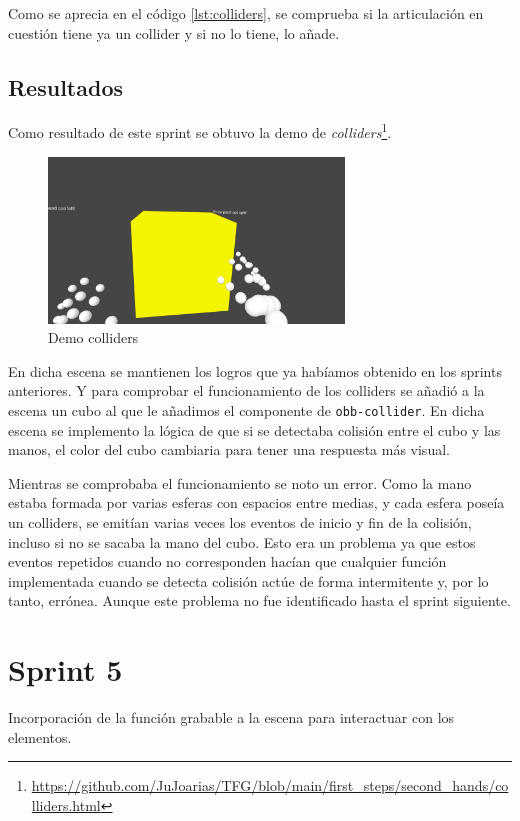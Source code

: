 \documentclass[a4paper, 12pt]{book}
\begin{document}
Como se aprecia en el código \ref{lst:colliders}, se comprueba si la articulación en cuestión tiene ya un collider y si no lo tiene, lo añade.

\subsection{Resultados}
\label{subsec:resultados4}
Como resultado de este sprint se obtuvo la demo de \textit{colliders}\footnote{\url{https://github.com/JuJoarias/TFG/blob/main/first_steps/second_hands/colliders.html}}. 

\begin{figure}[H] 
  \centering
  \includegraphics[width=0.7\textwidth]{img/collider.jpg} 
  \caption{Demo colliders}
  \label{fig:sprint4}
\end{figure}

En dicha escena se mantienen los logros que ya habíamos obtenido en los sprints anteriores. Y para comprobar el funcionamiento de los colliders se añadió a la escena un cubo
al que le añadimos el componente de \texttt{obb-collider}. En dicha escena se implemento la lógica de que si se detectaba colisión entre el cubo y las manos, el color del cubo cambiaria para tener una respuesta más visual. 

Mientras se comprobaba el funcionamiento se noto un error. Como la mano estaba formada por varias esferas con espacios entre medias, y cada esfera poseía un colliders, se emitían varias veces los eventos de inicio y fin de la colisión, incluso si no se sacaba la mano del cubo. 
Esto era un problema ya que estos eventos repetidos cuando no corresponden hacían que cualquier función implementada cuando se detecta colisión actúe de forma intermitente y, por lo tanto, errónea. Aunque este problema no fue identificado hasta el sprint siguiente. 

\section{Sprint 5}
\label{sec:sprint5}
Incorporación de la función grabable a la escena para interactuar con los elementos.
\end{document}
